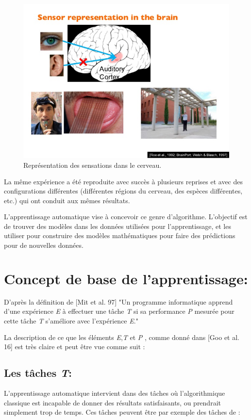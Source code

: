 \begin{figure}[H]
	\centering
		\includegraphics[width=5in]{Figures/OneLearningAlgoAndreNg.jpg}
	\caption[An Electron]{Représentation des sensations dans le cerveau.}
	\label{fig:Electron}
\end{figure}


La même expérience a été reproduite avec succès à plusieurs reprises et avec des configurations différentes (différentes régions du cerveau, des espèces différentes, etc.) qui ont conduit aux mêmes résultats.


L'apprentissage automatique vise à concevoir ce genre d'algorithme. L'objectif est de trouver des modèles dans les données utilisées pour l'apprentissage, et les utiliser pour construire des modèles mathématiques pour faire des prédictions pour de nouvelles données.

\section{Concept de base de l'apprentissage:}


D'après la définition de [Mit et al. 97] "Un programme informatique apprend d'une expérience \textit{E} à effectuer une tâche \textit{T} si sa performance \textit{P} mesurée pour cette tâche \textit{T} s'améliore avec l’expérience \textit{E}."

La description de ce que les éléments \textit{E},\textit{T} et \textit{P} , comme donné dans [Goo et al. 16] est très claire et peut être vue comme suit :

\subsection{Les tâches \textit{T}:} 
L'apprentissage automatique intervient dans des tâches où l'algorithmique classique est incapable de donner des résultats satisfaisants, ou prendrait simplement trop de temps. Ces tâches peuvent être par exemple des tâches de :

